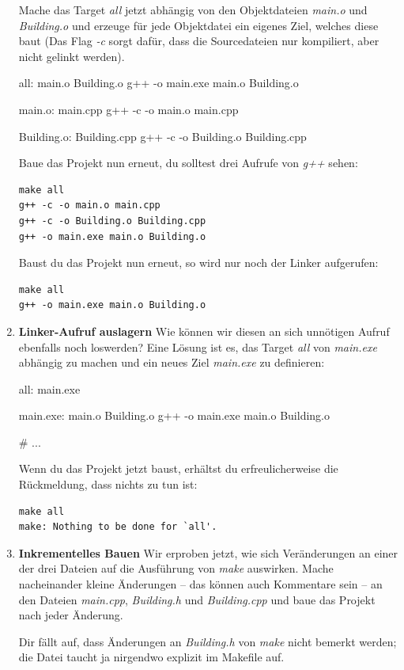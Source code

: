 \begin{enumerate}
Mache das Target \emph{all} jetzt abhängig von den Objektdateien \emph{main.o} und \emph{Building.o} und erzeuge für jede Objektdatei ein eigenes Ziel, welches diese baut (Das Flag \emph{-c} sorgt dafür, dass die Sourcedateien nur kompiliert, aber nicht gelinkt werden).
\begin{lstmake}
all: main.o Building.o
	g++ -o main.exe main.o Building.o

main.o: main.cpp
	g++ -c -o main.o main.cpp

Building.o: Building.cpp
	g++ -c -o Building.o Building.cpp
\end{lstmake}

Baue das Projekt nun erneut, du solltest drei Aufrufe von \emph{g++} sehen:
\begin{verbatim}
make all 
g++ -c -o main.o main.cpp
g++ -c -o Building.o Building.cpp
g++ -o main.exe main.o Building.o
\end{verbatim}
Baust du das Projekt nun erneut, so wird nur noch der Linker aufgerufen:
\begin{verbatim}
make all 
g++ -o main.exe main.o Building.o
\end{verbatim}

\item\textbf{Linker-Aufruf auslagern}
Wie können wir diesen an sich unnötigen Aufruf ebenfalls noch loswerden?
Eine Lösung ist es, das Target \emph{all} von \emph{main.exe} abhängig zu machen und ein neues Ziel \emph{main.exe} zu definieren:
\begin{lstmake}
all: main.exe

main.exe: main.o Building.o
	g++ -o main.exe main.o Building.o

# ...
\end{lstmake}

Wenn du das Projekt jetzt baust, erhältst du erfreulicherweise die Rückmeldung, dass nichts zu tun ist:
\begin{verbatim}
make all 
make: Nothing to be done for `all'.
\end{verbatim}

\item\textbf{Inkrementelles Bauen}
Wir erproben jetzt, wie sich Veränderungen an einer der drei Dateien auf die Ausführung von \emph{make} auswirken.
Mache nacheinander kleine Änderungen -- das können auch Kommentare sein -- an den Dateien \emph{main.cpp}, \emph{Building.h} und \emph{Building.cpp} und baue das Projekt nach jeder Änderung.

Dir fällt auf, dass Änderungen an \emph{Building.h} von \emph{make} nicht bemerkt werden; die Datei taucht ja nirgendwo explizit im Makefile auf.


\end{enumerate}
